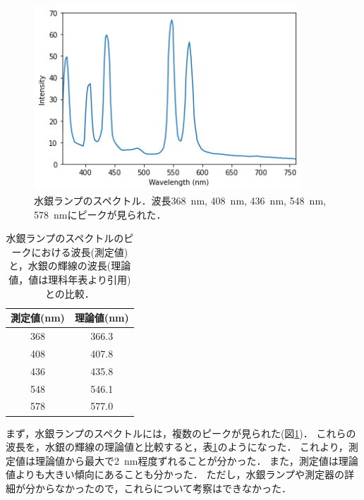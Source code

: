 \documentclass[a4paper,11pt, titlepage]{jsarticle}
\begin{document}
\begin{figure}[htbp]
    \centering
    \includegraphics[width=10cm]{Hglamp.png}
    \caption{水銀ランプのスペクトル．波長\SI{368}{\nm}, \SI{408}{\nm}, \SI{436}{\nm}, \SI{548}{\nm}, \SI{578}{\nm}にピークが見られた．}
    \label{fig:Hglamp}
\end{figure}

\begin{table}[htbp]
    \centering
    \caption{水銀ランプのスペクトルのピークにおける波長(測定値)と，水銀の輝線の波長(理論値，値は理科年表\cite{nenpyo}より引用)との比較．}
    \label{tab:Hglamp}
    \begin{tabular}{c|c}
        測定値(\si{\nm}) & 理論値(\si{\nm}) \\
        \hline\hline
        368 & 366.3 \\
        408 & 407.8 \\
        436 & 435.8 \\
        548 & 546.1 \\
        578 & 577.0 \\
        \hline 
    \end{tabular}
\end{table}

まず，水銀ランプのスペクトルには，複数のピークが見られた(図\ref{fig:Hglamp})．
これらの波長を，水銀の輝線の理論値と比較すると，表\ref{tab:Hglamp}のようになった．
これより，測定値は理論値から最大で\SI{2}{\nm}程度ずれることが分かった．
また，測定値は理論値よりも大きい傾向にあることも分かった．
ただし，水銀ランプや測定器の詳細が分からなかったので，これらについて考察はできなかった．
\end{document}
